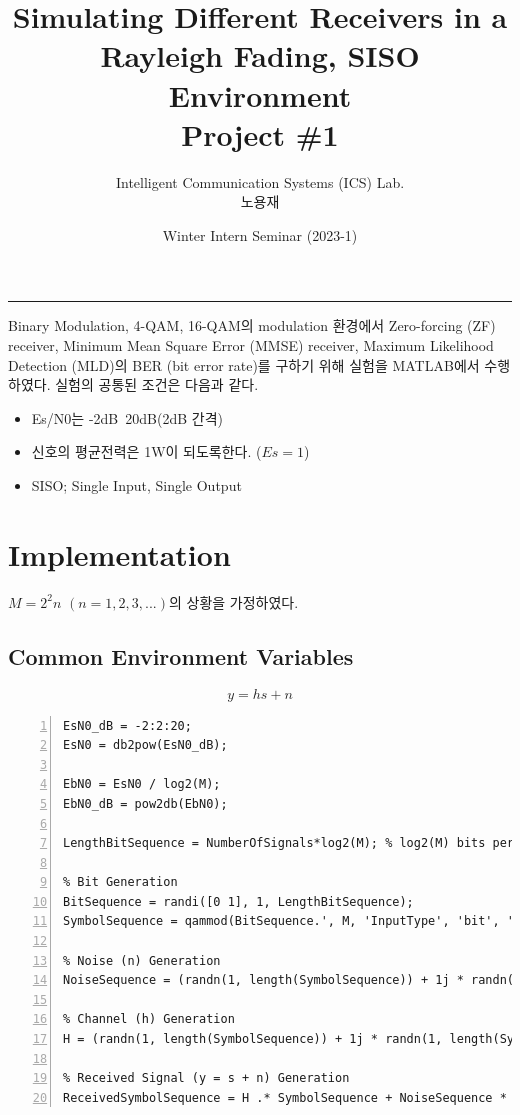 \documentclass{article}
\title{Simulating Different Receivers in a \\Rayleigh Fading, SISO Environment\\
\large Project \#1}
\author{Intelligent Communication Systems (ICS) Lab.\\노용재}
\date{Winter Intern Seminar (2023-1)}
\begin{document}
\maketitle
\tableofcontents
\vspace{0.5cm}
\hrule
\vspace{0.5cm}

Binary Modulation, 4-QAM, 16-QAM의 modulation 환경에서 Zero-forcing (ZF) receiver, Minimum Mean Square Error (MMSE) receiver, Maximum Likelihood Detection (MLD)의 BER (bit error rate)를 구하기 위해 실험을 MATLAB에서 수행하였다. 실험의 공통된 조건은 다음과 같다.

\begin{itemize}
  \item Es/N0는 -2dB~20dB(2dB 간격)
  \item 신호의 평균전력은 1W이 되도록한다. ($Es=1$)
  \item SISO; Single Input, Single Output
\end{itemize}
\section{Implementation}
$M=2^2n$ $(n=1,2,3,...)$의 상황을 가정하였다.
\subsection{Common Environment Variables}
\begin{equation}
y=hs+n
\end{equation}
\begin{lstlisting}[style=Matlab-editor, frame=single, numbers=left,]
EsN0_dB = -2:2:20;
EsN0 = db2pow(EsN0_dB);

EbN0 = EsN0 / log2(M);
EbN0_dB = pow2db(EbN0);

LengthBitSequence = NumberOfSignals*log2(M); % log2(M) bits per signal

% Bit Generation
BitSequence = randi([0 1], 1, LengthBitSequence);
SymbolSequence = qammod(BitSequence.', M, 'InputType', 'bit', 'UnitAveragePower', 1).';

% Noise (n) Generation
NoiseSequence = (randn(1, length(SymbolSequence)) + 1j * randn(1, length(SymbolSequence))) / sqrt(2); 

% Channel (h) Generation
H = (randn(1, length(SymbolSequence)) + 1j * randn(1, length(SymbolSequence))) ./ sqrt(2);

% Received Signal (y = s + n) Generation
ReceivedSymbolSequence = H .* SymbolSequence + NoiseSequence * sqrt(1 / EsN0(indx_EbN0));

\end{lstlisting}
\end{document}
